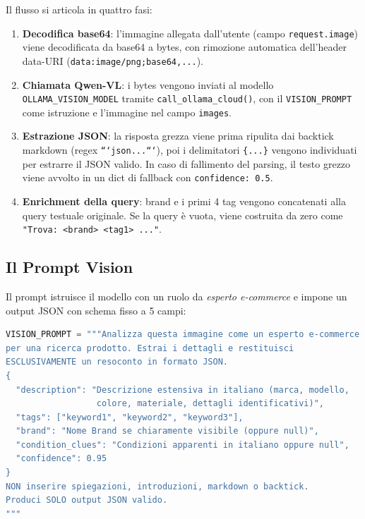 Il flusso si articola in quattro fasi:

\begin{enumerate}
    \item \textbf{Decodifica base64}: l'immagine allegata dall'utente
        (campo \texttt{request.image}) viene decodificata da base64
        a bytes, con rimozione automatica dell'header data-URI
        (\texttt{data:image/png;base64,...}).

    \item \textbf{Chiamata Qwen-VL}: i bytes vengono inviati al modello
        \texttt{OLLAMA\_VISION\_MODEL} tramite \texttt{call\_ollama\_cloud()},
        con il \texttt{VISION\_PROMPT} come istruzione e l'immagine
        nel campo \texttt{images}.

    \item \textbf{Estrazione JSON}: la risposta grezza viene prima
        ripulita dai backtick markdown (regex \texttt{```json...```}),
        poi i delimitatori \texttt{\{...\}} vengono individuati per
        estrarre il JSON valido. In caso di fallimento del parsing,
        il testo grezzo viene avvolto in un dict di fallback con
        \texttt{confidence: 0.5}.

    \item \textbf{Enrichment della query}: brand e i primi 4 tag vengono
        concatenati alla query testuale originale. Se la query è vuota,
        viene costruita da zero come \texttt{"Trova: <brand> <tag1> ..."}.
\end{enumerate}

\subsection{Il Prompt Vision}
\label{subsec:vision-prompt}

Il prompt istruisce il modello con un ruolo da \emph{esperto e-commerce}
e impone un output JSON con schema fisso a 5 campi:

\begin{lstlisting}[language=Python,caption={VISION\_PROMPT (app/llm/vision.py)},label=lst:vision-prompt]
VISION_PROMPT = """Analizza questa immagine come un esperto e-commerce
per una ricerca prodotto. Estrai i dettagli e restituisci
ESCLUSIVAMENTE un resoconto in formato JSON.
{
  "description": "Descrizione estensiva in italiano (marca, modello,
                  colore, materiale, dettagli identificativi)",
  "tags": ["keyword1", "keyword2", "keyword3"],
  "brand": "Nome Brand se chiaramente visibile (oppure null)",
  "condition_clues": "Condizioni apparenti in italiano oppure null",
  "confidence": 0.95
}
NON inserire spiegazioni, introduzioni, markdown o backtick.
Produci SOLO output JSON valido.
"""
\end{lstlisting}


